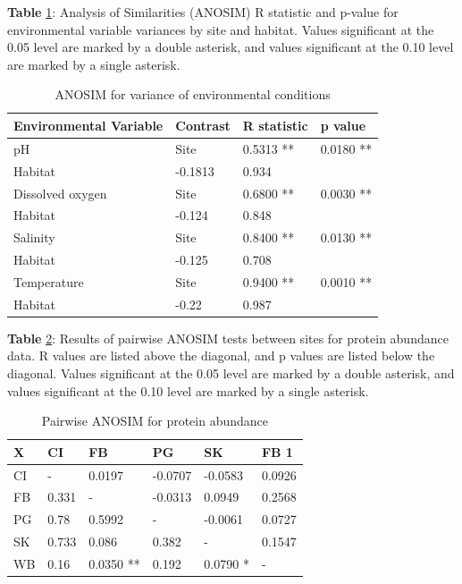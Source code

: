 \documentclass [11pt, proquest] {uwthesis}[2015/03/03]
\begin{document}
\textbf{Table} \ref{tab:envvariance}: Analysis of Similarities (ANOSIM) R statistic and p-value for environmental variable variances by site and habitat. Values significant at the 0.05 level are marked by a double asterisk, and values significant at the 0.10 level are marked by a single asterisk.

\begingroup\fontsize{8}{10}\selectfont
\begin{longtable}[t]{llll}
\caption{\label{tab:envvariance}ANOSIM for variance of environmental conditions}\\
\toprule
Environmental Variable & Contrast & R statistic & p value\\
\midrule
pH & Site & 0.5313 ** & 0.0180 **\\
Habitat & -0.1813 & 0.934 & \\
Dissolved oxygen & Site & 0.6800 ** & 0.0030 **\\
Habitat & -0.124 & 0.848 & \\
Salinity & Site & 0.8400 ** & 0.0130 **\\
\addlinespace
Habitat & -0.125 & 0.708 & \\
Temperature & Site & 0.9400 ** & 0.0010 **\\
Habitat & -0.22 & 0.987 & \\
\bottomrule
\end{longtable}
\endgroup{}
\clearpage

\textbf{Table} \ref{tab:protANOSIM}: Results of pairwise ANOSIM tests between sites for protein abundance data. R values are listed above the diagonal, and p values are listed below the diagonal. Values significant at the 0.05 level are marked by a double asterisk, and values significant at the 0.10 level are marked by a single asterisk.

\begingroup\fontsize{8}{10}\selectfont
\begin{longtable}[t]{llllll}
\caption{\label{tab:protANOSIM}Pairwise ANOSIM for protein abundance}\\
\toprule
X & CI & FB & PG & SK & FB 1\\
\midrule
CI & - & 0.0197 & -0.0707 & -0.0583 & 0.0926\\
FB & 0.331 & - & -0.0313 & 0.0949 & 0.2568\\
PG & 0.78 & 0.5992 & - & -0.0061 & 0.0727\\
SK & 0.733 & 0.086 & 0.382 & - & 0.1547\\
WB & 0.16 & 0.0350 ** & 0.192 & 0.0790 * & -\\
\bottomrule
\end{longtable}
\endgroup{}
\clearpage
\end{document}
